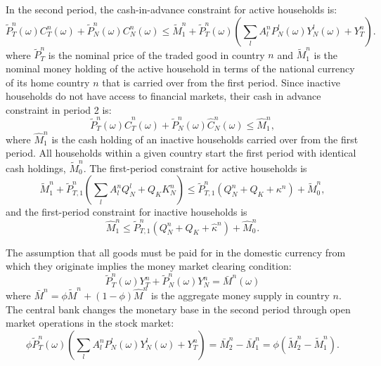 In the second period, the cash-in-advance constraint for active
households is:
\begin{equation}
  \tilde{P}^n_T(\omega) C^n_T(\omega) + \tilde{P}^n_N(\omega) C^n_N(\omega) 
  \le \tilde{M}^n_1 + \tilde{P}^n_T(\omega) 
  \left( \sum_l A_l^n P_N^l(\omega) Y_N^l(\omega) + Y_T^n \right).
  \label{eqn:seg_bc}
\end{equation}
where $\tilde{P}_T^n$ is the nominal price of the traded good in
country $n$ and $\tilde{M}^n_1$ is the nominal money holding of the
active household in terms of the national currency of its home country
$n$ that is carried over from the first period. Since inactive
households do not have access to financial markets, their cash in
advance constraint in period 2 is:
\begin{equation*}
  \tilde{P}^n_T(\omega) \hat{C}^n_T(\omega) + \tilde{P}^n_N(\omega) \hat{C}^n_N(\omega)
  \le \hat{M}^n_1,
\end{equation*}
where $\hat{M}^n_1$ is the cash holding of an inactive households
carried over from the first period. All households within a given
country start the first period with identical cash holdings,
$\tilde{M}^n_0$. The first-period constraint for active households is
\begin{equation}
  \tilde{M}^n_1 + \tilde{P}^n_{T, 1} 
  \left( \sum_l A^n_l Q^l_N + Q_K K^n_N \right) \le
  \tilde{P}^n_{T, 1} \left( Q^n_N + Q_K + \kappa^n \right) + \tilde{M}^n_0,
  \label{eqn:seg_bc1}
\end{equation}
and the first-period constraint for inactive households is
\begin{equation*}
  \hat{M}^n_1
  \le \tilde{P}^n_{T, 1} \left( Q^n_N + Q_K + \hat{\kappa}^n \right)
  + \hat{M}^n_0.
\end{equation*}

The assumption that all goods must be paid for in the domestic
currency from which they originate implies the money market clearing
condition:
\begin{equation}
  \tilde{P}^n_T(\omega) Y^n_T + \tilde{P}^n_N(\omega) Y^n_N = \bar{M}^n(\omega)
  \label{eqn:rc_money}
\end{equation}
where $\bar{M}^n = \phi \tilde{M}^n + (1 - \phi) \hat{M}^n$ is the
aggregate money supply in country $n$. The central bank changes the
monetary base in the second period through open market operations in
the stock market:
\begin{equation}
  \phi \tilde{P}^n_T(\omega) 
  \left( \sum_l A_l^n P_N^l(\omega) Y_N^l(\omega) + Y_T^n \right) 
  = \bar{M}^n_2 - \bar{M}^n_1 
  = \phi \left( \tilde{M}^n_2 - \tilde{M}^n_1 \right). 
  \label{eqn:seg_policy} 
\end{equation}

